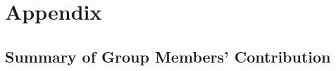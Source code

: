 \documentclass[12pt, openright, oneside]{report}
\begin{document}
\chapter*{Appendix}\label{chapter:appendix}


\section*{Summary of Group Members' Contribution}



\end{document}
